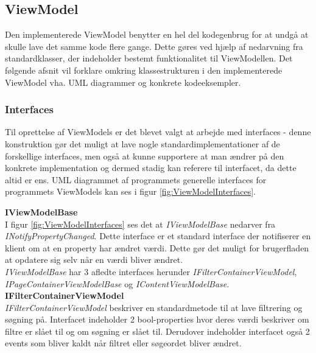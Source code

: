 \subsection*{ViewModel}
Den implementerede ViewModel benytter en hel del kodegenbrug for at undgå at skulle lave det samme kode flere gange. Dette gøres ved hjælp af nedarvning fra standardklasser, der indeholder bestemt funktionalitet til ViewModellen. Det følgende afsnit vil forklare omkring klassestrukturen i den implementerede ViewModel vha. UML diagrammer og konkrete kodeeksempler.

\subsubsection*{Interfaces}
Til oprettelse af ViewModels er det blevet valgt at arbejde med interfaces - denne konstruktion gør det muligt at lave nogle standardimplementationer af de forskellige interfaces, men også at kunne supportere at man ændrer på den konkrete implementation og dermed stadig kan referere til interfacet, da dette altid er ens. UML diagrammet af programmets generelle interfaces for programmets ViewModels kan ses i figur \ref{fig:ViewModelInterfaces}.


\textbf{IViewModelBase}\\
I figur \ref{fig:ViewModelInterfaces} ses det at \textit{IViewModelBase} nedarver fra \textit{INotifyPropertyChanged}. Dette interface er et standard interface der notifiserer en klient om at en property har ændret værdi. Dette gør det muligt for brugerfladen at opdatere sig selv når en værdi bliver ændret.\\

\textit{IViewModelBase} har 3 afledte interfaces herunder \textit{IFilterContainerViewModel}, \textit{IPageContainerViewModelBase} og \textit{IContentViewModelBase}.\\ 

\textbf{IFilterContainerViewModel}\\
\textit{IFilterContainerViewModel} beskriver en standardmetode til at lave filtrering og søgning på. Interfacet indeholder 2 bool-properties hvor deres værdi beskriver om filtre er slået til og om søgning er slået til. Derudover indeholder interfacet også 2 events som bliver kaldt når filtret eller søgeordet bliver ændret.\\

